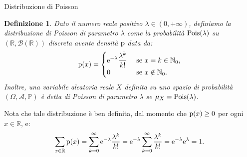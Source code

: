 \documentclass[11pt]{book}
\theoremstyle{Definizione}
\newtheorem*{mydef}{Definizione}
\theoremstyle{TeoremaProposizioneLemmaCorollario}
\theoremstyle{OsservazioneNota}
\newcommand{\R}{\mathbb{R}}
\newcommand{\N}{\mathbb{N}}
\renewcommand{\P}{\mathbb{P}}
\newcommand{\p}{\textup{p}}
\newcommand{\e}{\textup{e}}
\begin{document}
\begin{boxdef}{Distribuzione di Poisson}
\begin{mydef}
Dato il numero reale positivo $\lambda \in (0,+\infty)$, definiamo la distribuzione di Poisson di parametro $\lambda$ come la probabilità $\textup{Pois}(\lambda)$ su $(\R,\mathcal{B}(\R))$ discreta avente densità $\p$ data da:
$$
\p(x) = \begin{cases}
\displaystyle\e^{-\lambda} \frac{\lambda^k}{k!}&\textup{ se }x = k \in \N_0,\\
0 &\textup{ se } x\notin \N_0.
\end{cases}
$$
Inoltre, una variabile aleatoria reale $X$ definita su uno spazio di probabilità $(\Omega,\mathcal{A},\P)$ è detta di Poisson di parametro $\lambda$ se $\mu_X = \textup{Pois}(\lambda)$.
\end{mydef}
\end{boxdef}
\noindent
Nota che tale distribuzione è ben definita, dal momento che $\p(x) \geq 0$ per ogni $x\in \R$, e:
$$
\sum_{x\in \R} \p(x) = \sum_{k = 0}^\infty \e^{-\lambda} \frac{\lambda^k}{k!} = \e^{-\lambda} \sum_{k = 0}^\infty \frac{\lambda^k}{k!} = \e^{-\lambda}\e^{\lambda} = 1. 
$$
\end{document}
